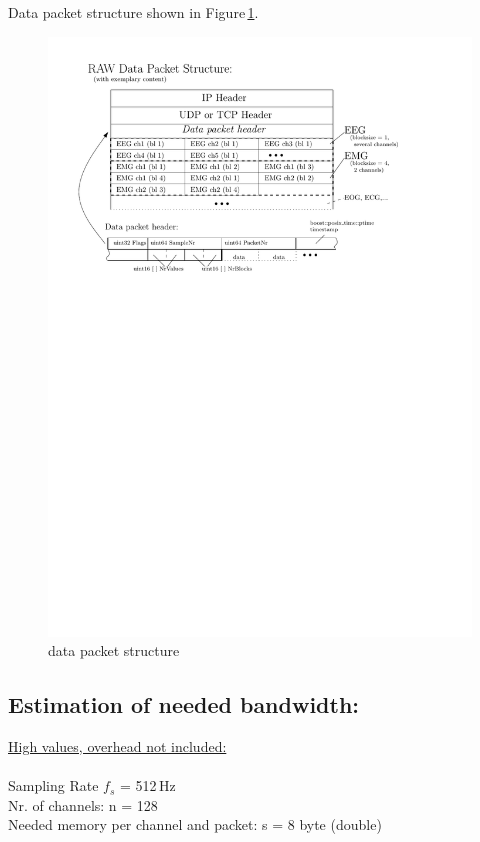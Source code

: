 \documentclass[11pt]{scrartcl}
\begin{document}
  \newpage

  Data packet structure shown in Figure\,\ref{fig:data-packet-structure}.\\

    \begin{figure}[htbp]
      \centering
        \includegraphics[scale=0.94]{data-packet-structure.pdf}
      \caption{data packet structure}
      \label{fig:data-packet-structure}
    \end{figure}

  \newpage
  \subsection{Estimation of needed bandwidth:}

  \underline{High values, overhead not included:}\\
  \\
  Sampling Rate $f_s$ = 512\,Hz\\
  Nr. of channels: n = 128\\
  Needed memory per channel and packet: s = 8 byte (double)\\
\end{document}
